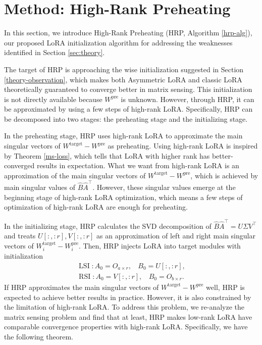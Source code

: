 \section{Method: High-Rank Preheating}
In this section, we introduce High-Rank Preheating (HRP, Algorithm \ref{hrp-alg}), our proposed LoRA initialization algorithm for addressing the weaknesses identified in Section \ref{sec:theory}. 

The target of HRP is approaching the wise initialization suggested in Section \ref{theory-observation}, which makes both Asymmetric LoRA and classic LoRA theoretically guaranteed to converge better in matrix sensing. This initialization is not directly available because $W^{\operatorname{pre}}$ is unknown. However, through HRP, it can be approximated by using a few steps of high-rank LoRA. Specifically, HRP can be decomposed into two stages: the preheating stage and the initializing stage. 

In the preheating stage, HRP uses high-rank LoRA to approximate the main singular vectors of $W^{\operatorname{target}}-W^{\operatorname{pre}}$ as preheating. 
Using high-rank LoRA is inspired by Theorem \ref{ms-loss}, which tells that LoRA with higher rank has better-converged results in expectation. What we want from high-rank LoRA is an approximation of the main singular vectors of $W^{\operatorname{target}}-W^{\operatorname{pre}}$, which is achieved by main singular values of $\hat{B}\hat{A}^\top$. However, these singular values emerge at the beginning stage of high-rank LoRA optimization, which means a few steps of optimization of high-rank LoRA are enough for preheating. 

In the initializing stage, HRP calculates the SVD decomposition of $\hat{B}\hat{A}^\top=U\Sigma V^\top$ and treats $U[:,:r], V[:,:r]$ as an approximation of left and right main singular vectors of $W_i^{\operatorname{target}}-W_i^{\operatorname{pre}}$. 
Then, HRP injects LoRA into target modules with initialization
\begin{align*}
    \operatorname{LSI}: A_0=O_{a\times r},~~~~B_0=U[:,:r],\\
    \operatorname{RSI}: A_0=V[:,:r],~~~~B_0=O_{b\times r}.
\end{align*}
If HRP approximates the main singular vectors of $W^{\operatorname{target}}-W^{\operatorname{pre}}$ well, HRP is expected to achieve better results in practice. However, it is also constrained by the limitation of high-rank LoRA. To address this problem, we re-analyze the matrix sensing problem and find that at least, HRP makes low-rank LoRA have comparable convergence properties with high-rank LoRA. Specifically, we have the following theorem. 

